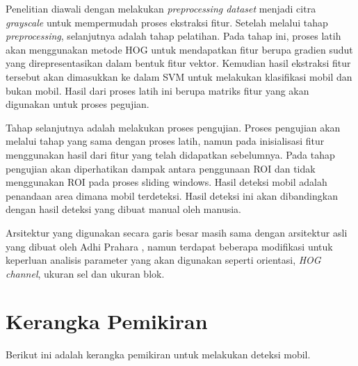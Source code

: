 Penelitian   diawali   dengan   melakukan \textit{preprocessing dataset} menjadi citra \textit{grayscale} untuk mempermudah proses ekstraksi fitur. Setelah melalui tahap \textit{preprocessing}, selanjutnya adalah tahap pelatihan. Pada tahap ini, proses latih akan menggunakan metode HOG untuk mendapatkan fitur berupa gradien sudut yang direpresentasikan dalam bentuk fitur vektor. Kemudian hasil ekstraksi fitur tersebut akan dimasukkan ke dalam SVM untuk melakukan klasifikasi mobil dan bukan mobil. Hasil dari proses latih ini berupa matriks fitur yang akan digunakan untuk proses pegujian.

Tahap selanjutnya adalah melakukan proses pengujian. Proses pengujian akan melalui tahap yang sama dengan proses latih, namun pada inisialisasi fitur menggunakan hasil dari  fitur  yang  telah  didapatkan  sebelumnya. Pada tahap pengujian akan diperhatikan dampak antara penggunaan ROI dan tidak menggunakan ROI pada proses sliding windows. Hasil  deteksi  mobil adalah penandaan area dimana mobil terdeteksi.  Hasil deteksi  ini  akan  dibandingkan  dengan hasil deteksi yang  dibuat  manual  oleh  manusia.

Arsitektur yang digunakan  secara  garis  besar  masih  sama  dengan  arsitektur asli yang dibuat oleh Adhi Prahara \cite{prahara}, namun terdapat beberapa modifikasi untuk keperluan analisis parameter yang akan digunakan seperti orientasi, \textit{HOG channel}, ukuran sel dan ukuran blok.
\\

\section{Kerangka Pemikiran}
Berikut ini adalah kerangka pemikiran untuk melakukan deteksi mobil.\\

\begin{adjustbox}{width=1\textwidth}
	\begin{minipage}{\linewidth}
	\label{fig:KerangkaPemikiran}
\end{minipage}
\end{adjustbox}

